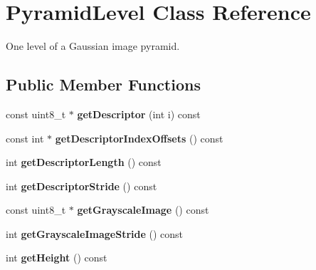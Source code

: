 \hypertarget{classfovis_1_1PyramidLevel}{
\section{PyramidLevel Class Reference}
\label{classfovis_1_1PyramidLevel}
}


One level of a Gaussian image pyramid.  


\subsection*{Public Member Functions}
\begin{DoxyCompactItemize}
\item 
\hypertarget{classfovis_1_1PyramidLevel_af18feed592ad68f72aaee04c31021932}{
const uint8\_\-t $\ast$ {\bfseries getDescriptor} (int i) const }
\label{classfovis_1_1PyramidLevel_af18feed592ad68f72aaee04c31021932}

\item 
\hypertarget{classfovis_1_1PyramidLevel_acb4a60e9159801a3486dd6f2081cf346}{
const int $\ast$ {\bfseries getDescriptorIndexOffsets} () const }
\label{classfovis_1_1PyramidLevel_acb4a60e9159801a3486dd6f2081cf346}

\item 
\hypertarget{classfovis_1_1PyramidLevel_ace19c8012ae7eaa4db2f807167b165f9}{
int {\bfseries getDescriptorLength} () const }
\label{classfovis_1_1PyramidLevel_ace19c8012ae7eaa4db2f807167b165f9}

\item 
\hypertarget{classfovis_1_1PyramidLevel_ab19595fa4e4bb6716f9ed7fa38a297b2}{
int {\bfseries getDescriptorStride} () const }
\label{classfovis_1_1PyramidLevel_ab19595fa4e4bb6716f9ed7fa38a297b2}

\item 
\hypertarget{classfovis_1_1PyramidLevel_a5ecca567fb6513c431d45af12bb21e96}{
const uint8\_\-t $\ast$ {\bfseries getGrayscaleImage} () const }
\label{classfovis_1_1PyramidLevel_a5ecca567fb6513c431d45af12bb21e96}

\item 
\hypertarget{classfovis_1_1PyramidLevel_a88777237ef606ffe6653a0f7eda10bd5}{
int {\bfseries getGrayscaleImageStride} () const }
\label{classfovis_1_1PyramidLevel_a88777237ef606ffe6653a0f7eda10bd5}

\item 
\hypertarget{classfovis_1_1PyramidLevel_a317329daf960a1759801c0f16d43d5a3}{
int {\bfseries getHeight} () const }
\label{classfovis_1_1PyramidLevel_a317329daf960a1759801c0f16d43d5a3}


\end{DoxyCompactItemize}
